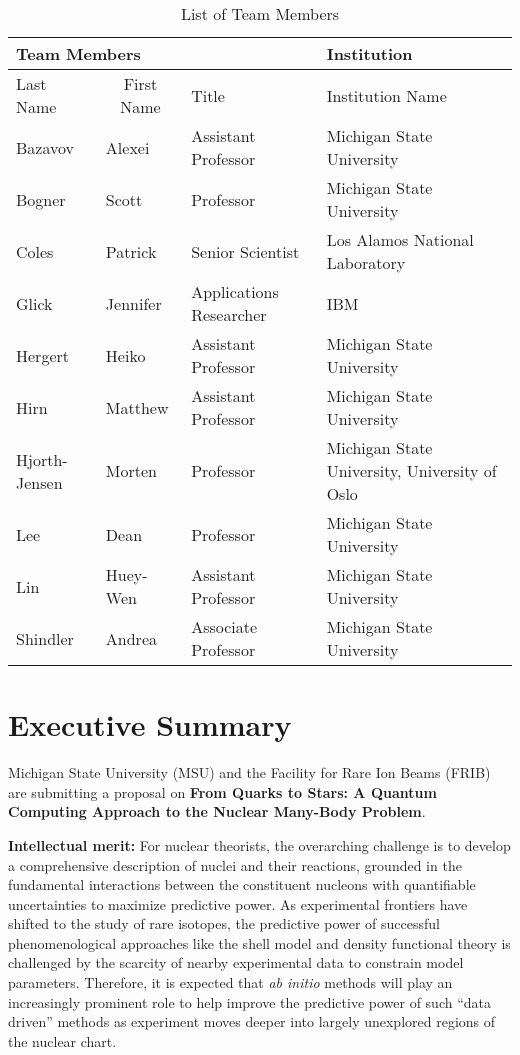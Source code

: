 \documentclass[10pt]{article}
\begin{document}
\begin{table}[hbtp]
\caption{List of Team Members}
\begin{center}
\begin{tabular}{|l|l|l|l|}
\hline
\multicolumn{3}{|l}{{\bf Team Members} } & \multicolumn{1}{|l|}{{\bf Institution}}\\
\hline
\multicolumn{1}{|l}{Last Name} & \multicolumn{1}{|c|}{First Name} & \multicolumn{1}{l|}{Title} & \multicolumn{1}{l|}{Institution Name} \\
\hline
Bazavov & Alexei & Assistant Professor & Michigan State University \\
\hline
Bogner & Scott & Professor & Michigan State University \\
\hline
Coles & Patrick & Senior Scientist & Los Alamos National Laboratory \\
\hline
Glick & Jennifer & Applications Researcher & IBM \\
\hline
Hergert & Heiko & Assistant Professor & Michigan State University \\
\hline
Hirn & Matthew & Assistant Professor & Michigan State University \\
\hline
Hjorth-Jensen & Morten & Professor & Michigan State University, University of Oslo\\
\hline
Lee & Dean & Professor & Michigan State University \\
\hline
Lin & Huey-Wen & Assistant Professor & Michigan State University \\
\hline
Shindler & Andrea & Associate Professor & Michigan State University \\
\hline

\end{tabular}
\end{center}
\end{table}

\newpage
\tableofcontents
\section{Executive Summary}

Michigan State University (MSU) and the Facility for Rare Ion Beams (FRIB) are submitting 
a proposal on {\bf From Quarks to Stars: A Quantum Computing Approach to the Nuclear Many-Body Problem}. 

{\bf Intellectual merit:} For nuclear theorists, the overarching
challenge is to develop a comprehensive description of nuclei and
their reactions, grounded in the fundamental interactions between the
constituent nucleons with quantifiable uncertainties to maximize
predictive power.  As experimental frontiers have shifted to the study
of rare isotopes, the predictive power of successful phenomenological
approaches like the shell model and density functional theory is
challenged by the scarcity of nearby experimental data to constrain
model parameters. Therefore, it is expected that \emph{ab initio}
methods will play an increasingly prominent role to help improve the
predictive power of such ``data driven'' methods as experiment moves
deeper into largely unexplored regions of the nuclear chart.
\end{document}
